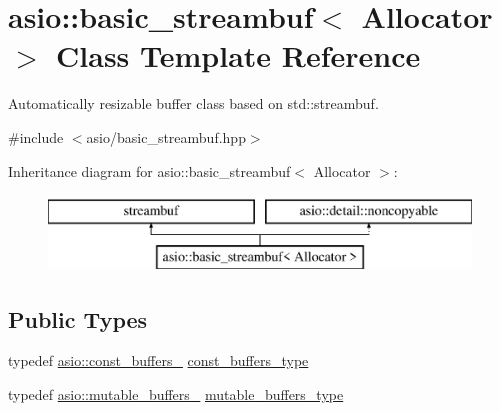 \hypertarget{classasio_1_1basic__streambuf}{}\section{asio\+:\+:basic\+\_\+streambuf$<$ Allocator $>$ Class Template Reference}
\label{classasio_1_1basic__streambuf}


Automatically resizable buffer class based on std\+::streambuf.  




{\ttfamily \#include $<$asio/basic\+\_\+streambuf.\+hpp$>$}

Inheritance diagram for asio\+:\+:basic\+\_\+streambuf$<$ Allocator $>$\+:\begin{figure}[H]
\begin{center}
\leavevmode
\includegraphics[height=2.000000cm]{classasio_1_1basic__streambuf}
\end{center}
\end{figure}
\subsection*{Public Types}
\begin{DoxyCompactItemize}
\item 
typedef \hyperlink{classasio_1_1const__buffers__1}{asio\+::const\+\_\+buffers\+\_} \hyperlink{classasio_1_1basic__streambuf_a6318f8e7cef616d25207918033f02bc9}{const\+\_\+buffers\+\_\+type}
\item 
typedef \hyperlink{classasio_1_1mutable__buffers__1}{asio\+::mutable\+\_\+buffers\+\_} \hyperlink{classasio_1_1basic__streambuf_a4d2090a05e1d13270b4e30d848517272}{mutable\+\_\+buffers\+\_\+type}
\end{DoxyCompactItemize}

